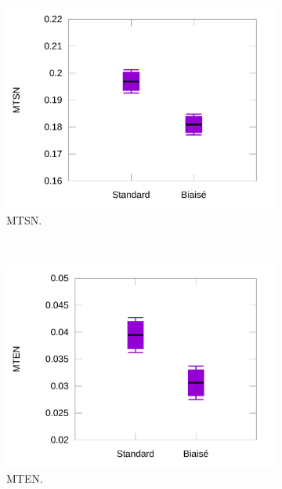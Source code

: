 	\begin{figure}[!htb]
		\begin{subfigure}[t]{0.49\textwidth}
			\centering
			\includegraphics[width=\textwidth]{figures/ch5/hookNormTimes}
			\caption{MTSN.}
			\label{fig:hookNormTimes}
		\end{subfigure}
		~
		\begin{subfigure}[t]{0.49\textwidth}
			\centering
			\includegraphics[width=\textwidth]{figures/ch5/hookNormErrors}
			\caption{MTEN.}
			\label{fig:hookNormErrors}
		\end{subfigure}
		~
		\begin{subfigure}[t]{0.49\textwidth}
			\centering

\end{subfigure}
\end{figure}
